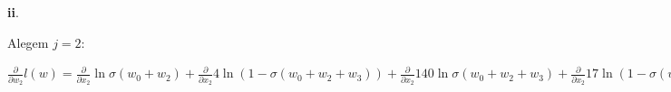 \documentclass{article}
\begin{document}
\textbf{ii}.

Alegem \( j = 2 \):

\( \frac{\partial}{\partial w_2} l(w) = \frac{\partial}{\partial x_2} \ln \sigma (w_0 + w_2) 
+ \frac{\partial}{\partial x_2} 4 \ln (1 - \sigma (w_0 + w_2 + w_3)) + \frac{\partial}{\partial x_2} 140 \ln \sigma (w_0 + w_2 + w_3) 
+ \frac{\partial}{\partial x_2} 17 \ln (1 - \sigma (w_0 + w_1 + w_2)) + \frac{\partial}{\partial x_2} 27 \ln \sigma (w_0 + w_1 + w_2) 
+ \frac{\partial}{\partial x_2} 105 \ln (1 - \sigma (w_0 + w_1 + w_2 + w_3)) + \frac{\partial}{\partial x_2} 176 \ln \sigma (w_0 + w_1 + w_2 + w_3) \)
\end{document}
